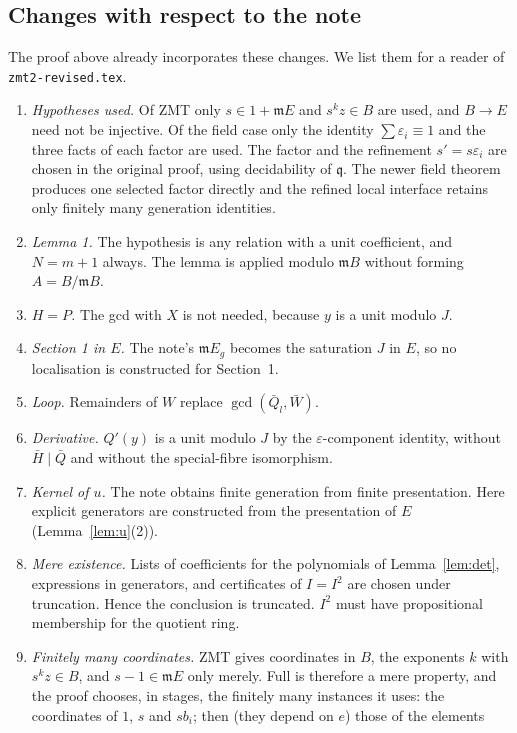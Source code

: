 \documentclass[11pt]{amsart}
\numberwithin{equation}{section}
\theoremstyle{definition}
\theoremstyle{remark}
\newcommand{\m}{\mathfrak m}
\newcommand{\q}{\mathfrak q}
\newcommand{\code}[1]{\texttt{#1}}
\begin{document}
\subsection{Changes with respect to the note}
The proof above already incorporates these changes. We list them for a
reader of \code{zmt2-revised.tex}.
\begin{enumerate}
\item \emph{Hypotheses used.} Of ZMT only $s\in1+\m E$ and
$s^kz\in B$ are used, and $B\to E$ need not be injective. Of the field
case only the identity $\sum\varepsilon_i\equiv1$ and the three facts of
each factor are used. The factor and the refinement $s'=s\varepsilon_i$
are chosen in the original proof, using decidability of $\q$. The newer
field theorem produces one selected factor directly and the refined
local interface retains only finitely many generation identities.
\item \emph{Lemma 1.} The hypothesis is any relation with a unit
coefficient, and $N=m+1$ always. The lemma is applied modulo $\m B$
without forming $A=B/\m B$.
\item \emph{$H=P$.} The gcd with $X$ is not needed, because $y$ is a
unit modulo $J$.
\item \emph{Section 1 in $E$.} The note's $\m E_g$ becomes the
saturation $J$ in $E$, so no localisation is constructed for
Section~1.
\item \emph{Loop.} Remainders of $W$ replace $\gcd(\bar Q_l,\bar W)$.
\item \emph{Derivative.} $Q'(y)$ is a unit modulo $J$ by the
$\varepsilon$-component identity, without $\bar H\mid\bar Q$ and without
the special-fibre isomorphism.
\item \emph{Kernel of $u$.} The note obtains finite generation from
finite presentation. Here explicit generators are constructed from the
presentation of $E$ (Lemma~\ref{lem:u}(2)).
\item \emph{Mere existence.} Lists of coefficients for the polynomials
of Lemma~\ref{lem:det}, expressions in generators, and certificates of
$I=I^2$ are chosen under truncation. Hence the conclusion is
truncated. $I^2$ must have propositional membership for the quotient
ring.
\item \emph{Finitely many coordinates.} ZMT gives coordinates in $B$,
the exponents $k$ with $s^kz\in B$, and $s-1\in\m E$ only merely.
Full is therefore a mere property, and the proof chooses, in stages,
the finitely many instances it uses: the coordinates of $1$, $s$ and
$sb_i$; then (they depend on $e$) those of the elements

\end{enumerate}
\end{document}
